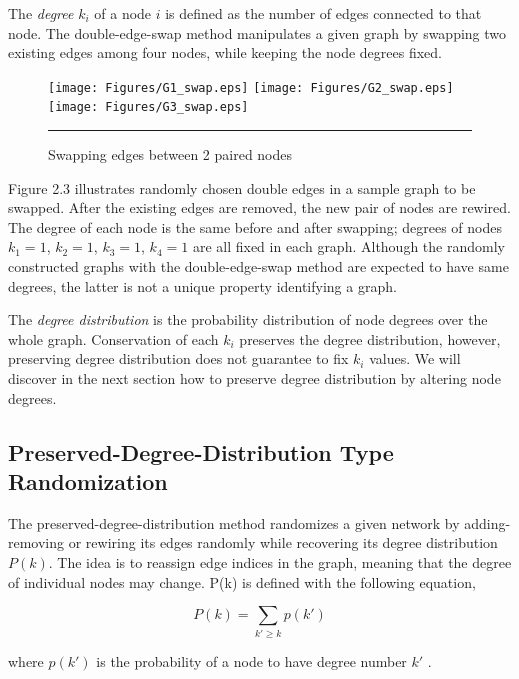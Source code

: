 The \textit{degree} $k_i$ of a node $i$ is defined as the number of edges connected to that node. The double-edge-swap method manipulates a given graph by swapping two existing edges among four nodes, while keeping the node degrees fixed. 


\begin{figure}[htbp]
  \centering
	\texttt{[image: Figures/G1\_swap.eps]}  
    \texttt{[image: Figures/G2\_swap.eps]}  
	\texttt{[image: Figures/G3\_swap.eps]} 
    \rule{35em}{0.5pt}
  \caption[Double-Edge-Swap Example]{Swapping edges between 2 paired nodes}
  \label{fig:Double-Edge-Swap Example}
\end{figure}

Figure 2.3 illustrates randomly chosen double edges in a sample graph to be swapped. After the existing edges are removed, the new pair of nodes are rewired. The degree of each node is the same before and after swapping; degrees of nodes $k_1 = 1$, $k_2=1$, $k_3=1$, $k_4=1$ are all fixed in each graph. Although the randomly constructed graphs with the double-edge-swap method are expected to have same degrees, the latter is not a unique property identifying a graph.

The \textit{degree distribution} is the probability distribution of node degrees over the whole graph. Conservation of each $k_i$ preserves the degree distribution, however, preserving degree distribution does not guarantee to fix $k_i$ values. We will discover in the next section how to preserve degree distribution by altering node degrees.

\subsection{Preserved-Degree-Distribution Type Randomization}

The preserved-degree-distribution method randomizes a given network by adding-removing or rewiring its edges randomly while recovering its degree distribution $P(k)$. The idea is to reassign edge indices in the graph, meaning that the degree of individual nodes may change. P(k) is defined with the following equation,

\begin{equation}
P(k) = \sum_{k' \geq k} p(k')
\end{equation}

where $p(k')$ is the probability of a node to have degree number $k'$ \citep{BAR99a}.


